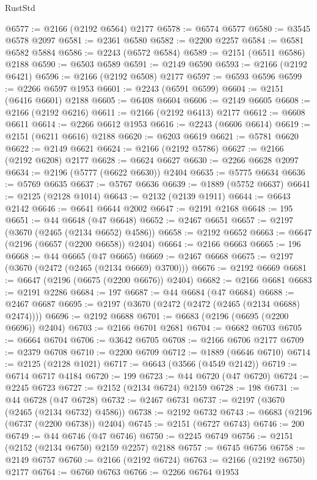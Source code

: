 \begin{lexlean}{RustStd}
\begin{coremodule}
@6577 := @2166 (@2192 @6564) @2177
@6578 := @6574 @6577
@6580 := @3545 @6578 @2097
@6581 := @2361 @6580
@6582 := @2200 @2257
@6584 := @6581 @6582 @5884
@6586 := @2243 (@6572 @6584)
@6589 := @2151 (@6511 @6586) @2188
@6590 := @6503 @6589
@6591 := @2149 @6590
@6593 := @2166 (@2192 @6421)
@6596 := @2166 (@2192 @6508) @2177
@6597 := @6593 @6596
@6599 := @2266 @6597 @1953
@6601 := @2243 (@6591 @6599)
@6604 := @2151 (@6416 @6601) @2188
@6605 := @6408 @6604
@6606 := @2149 @6605
@6608 := @2166 (@2192 @6216)
@6611 := @2166 (@2192 @6413) @2177
@6612 := @6608 @6611
@6614 := @2266 @6612 @1953
@6616 := @2243 (@6606 @6614)
@6619 := @2151 (@6211 @6616) @2188
@6620 := @6203 @6619
@6621 := @5781 @6620
@6622 := @2149 @6621
@6624 := @2166 (@2192 @5786)
@6627 := @2166 (@2192 @6208) @2177
@6628 := @6624 @6627
@6630 := @2266 @6628 @2097
@6634 := @2196 (@5777 (@6622 @6630)) @2404
@6635 := @5775 @6634
@6636 := @5769 @6635
@6637 := @5767 @6636
@6639 := @1889 (@5752 @6637)
@6641 := @2125 (@2128 @1014)
@6643 := @2132 (@2139 @1911)
@6644 := @6643 @2142
@6646 := @6641 @6644 @2002
@6647 := @2191 @2168
@6648 := 195
@6651 := @44 @6648 (@47 @6648)
@6652 := @2467 @6651
@6657 := @2197 (@3670 (@2465 (@2134 @6652) @4586))
@6658 := @2192 @6652
@6663 := @6647 (@2196 (@6657 (@2200 @6658)) @2404)
@6664 := @2166 @6663
@6665 := 196
@6668 := @44 @6665 (@47 @6665)
@6669 := @2467 @6668
@6675 := @2197 (@3670 (@2472 (@2465 (@2134 @6669) @3700)))
@6676 := @2192 @6669
@6681 := @6647 (@2196 (@6675 (@2200 @6676)) @2404)
@6682 := @2166 @6681
@6683 := @2191 @2286
@6684 := 197
@6687 := @44 @6684 (@47 @6684)
@6688 := @2467 @6687
@6695 := @2197 (@3670 (@2472 (@2472 (@2465 (@2134 @6688) @2474))))
@6696 := @2192 @6688
@6701 := @6683 (@2196 (@6695 (@2200 @6696)) @2404)
@6703 := @2166 @6701 @2681
@6704 := @6682 @6703
@6705 := @6664 @6704
@6706 := @3642 @6705
@6708 := @2166 @6706 @2177
@6709 := @2379 @6708
@6710 := @2200 @6709
@6712 := @1889 (@6646 @6710)
@6714 := @2125 (@2128 @1021)
@6717 := @6643 (@3566 (@4549 @2142))
@6719 := @6714 @6717 @4184
@6720 := 199
@6723 := @44 @6720 (@47 @6720)
@6724 := @2245 @6723
@6727 := @2152 (@2134 @6724) @2159
@6728 := 198
@6731 := @44 @6728 (@47 @6728)
@6732 := @2467 @6731
@6737 := @2197 (@3670 (@2465 (@2134 @6732) @4586))
@6738 := @2192 @6732
@6743 := @6683 (@2196 (@6737 (@2200 @6738)) @2404)
@6745 := @2151 (@6727 @6743)
@6746 := 200
@6749 := @44 @6746 (@47 @6746)
@6750 := @2245 @6749
@6756 := @2151 (@2152 (@2134 @6750) @2159 @2257) @2188
@6757 := @6745 @6756
@6758 := @2149 @6757
@6760 := @2166 (@2192 @6724)
@6763 := @2166 (@2192 @6750) @2177
@6764 := @6760 @6763
@6766 := @2266 @6764 @1953

\end{coremodule}
\end{lexlean}
